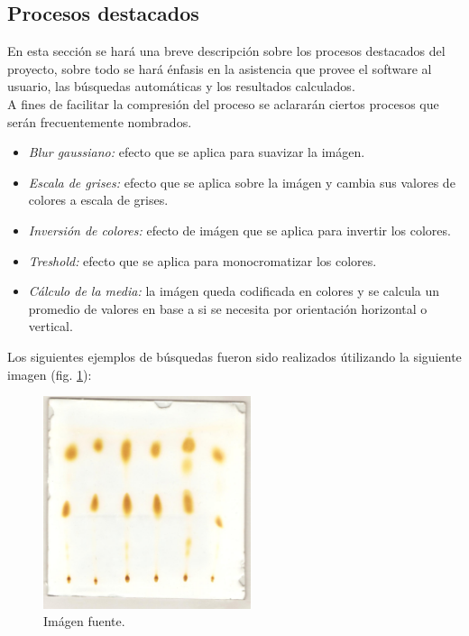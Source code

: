 \subsection{Procesos destacados}
En esta secci\'on se har\'a una breve descripci\'on sobre los procesos destacados del proyecto, sobre todo se har\'a \'enfasis en la asistencia que provee el software al usuario, las b\'usquedas autom\'aticas y los resultados calculados.\\
A fines de facilitar la compresi\'on del proceso se aclarar\'an ciertos procesos que ser\'an frecuentemente nombrados.
\begin{itemize}
	\renewcommand{\labelitemi}{$\bullet$}
	\renewcommand{\labelitemii}{$\circ$}
	
	\item \textit{Blur gaussiano:} efecto que se aplica para suavizar la im\'agen.
	\item \textit{Escala de grises:} efecto que se aplica sobre la im\'agen y cambia sus valores de colores a escala de grises.
	\item \textit{Inversi\'on de colores:} efecto de im\'agen que se aplica para invertir los colores.
	\item \textit{Treshold:} efecto que se aplica para monocromatizar los colores.
	\item \textit{C\'alculo de la media:} la im\'agen queda codificada en colores y se calcula un promedio de valores en base a si se necesita por orientaci\'on horizontal o vertical.
\end{itemize}

Los siguientes ejemplos de b\'usquedas fueron sido realizados \'utilizando la siguiente imagen (fig. \ref{fig:image-font}):

\begin{figure}[H]
	\vspace{-0.2cm}
	\centering
	\includegraphics[width=230px]{imagenes-jtlc/experimento/fuente}
	\centering
	\vspace{-0.4cm}
	\caption{Im\'agen fuente.}
	\label{fig:image-font}
	\vspace{-0.15cm}
\end{figure}

